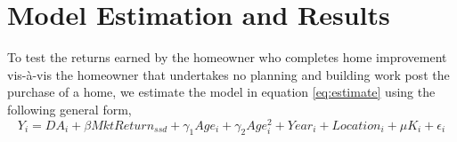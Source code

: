 \documentclass[AEJ,reqno, draftmode]{AEA} %
\begin{document}
\section{Model Estimation and Results}


To test the returns earned by the homeowner who completes home improvement vis-à-vis the homeowner that undertakes no planning and building work post the purchase of a home, we estimate the model in equation \ref{eq:estimate} using the following general form,
\begin{equation}
    Y_i = DA_i + \beta{MktReturn_{ssd}} + \gamma_1{Age_i} + \gamma_2{Age_i^2} + Year_i + Location_i + \mu{K_i} + \epsilon_i
\end{equation}
\end{document}
